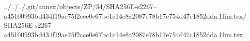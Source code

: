../../../.git/annex/objects/ZP/34/SHA256E-s2267--a45100993bd434f19ae75f2cce0e67bc1c14e8a2087e78b17e754d47c1852dda.1lim.tex/SHA256E-s2267--a45100993bd434f19ae75f2cce0e67bc1c14e8a2087e78b17e754d47c1852dda.1lim.tex